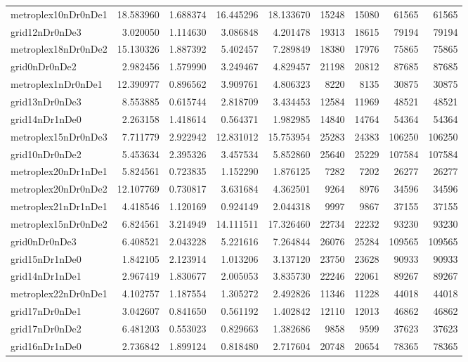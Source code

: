 \begin{longtable}{|l|r|r|r|r|r|r|r|r|}
metroplex10nDr0nDe1 & 18.583960 & 1.688374 & 16.445296 & 18.133670 & 15248 & 15080 & 61565 & 61565 \\
grid12nDr0nDe3 & 3.020050 & 1.114630 & 3.086848 & 4.201478 & 19313 & 18615 & 79194 & 79194 \\
metroplex18nDr0nDe2 & 15.130326 & 1.887392 & 5.402457 & 7.289849 & 18380 & 17976 & 75865 & 75865 \\
grid0nDr0nDe2 & 2.982456 & 1.579990 & 3.249467 & 4.829457 & 21198 & 20812 & 87685 & 87685 \\
metroplex1nDr0nDe1 & 12.390977 & 0.896562 & 3.909761 & 4.806323 & 8220 & 8135 & 30875 & 30875 \\
grid13nDr0nDe3 & 8.553885 & 0.615744 & 2.818709 & 3.434453 & 12584 & 11969 & 48521 & 48521 \\
grid14nDr1nDe0 & 2.263158 & 1.418614 & 0.564371 & 1.982985 & 14840 & 14764 & 54364 & 54364 \\
metroplex15nDr0nDe3 & 7.711779 & 2.922942 & 12.831012 & 15.753954 & 25283 & 24383 & 106250 & 106250 \\
grid10nDr0nDe2 & 5.453634 & 2.395326 & 3.457534 & 5.852860 & 25640 & 25229 & 107584 & 107584 \\
metroplex20nDr1nDe1 & 5.824561 & 0.723835 & 1.152290 & 1.876125 & 7282 & 7202 & 26277 & 26277 \\
metroplex20nDr0nDe2 & 12.107769 & 0.730817 & 3.631684 & 4.362501 & 9264 & 8976 & 34596 & 34596 \\
metroplex21nDr1nDe1 & 4.418546 & 1.120169 & 0.924149 & 2.044318 & 9997 & 9867 & 37155 & 37155 \\
metroplex15nDr0nDe2 & 6.824561 & 3.214949 & 14.111511 & 17.326460 & 22734 & 22232 & 93230 & 93230 \\
grid0nDr0nDe3 & 6.408521 & 2.043228 & 5.221616 & 7.264844 & 26076 & 25284 & 109565 & 109565 \\
grid15nDr1nDe0 & 1.842105 & 2.123914 & 1.013206 & 3.137120 & 23750 & 23628 & 90933 & 90933 \\
grid14nDr1nDe1 & 2.967419 & 1.830677 & 2.005053 & 3.835730 & 22246 & 22061 & 89267 & 89267 \\
metroplex22nDr0nDe1 & 4.102757 & 1.187554 & 1.305272 & 2.492826 & 11346 & 11228 & 44018 & 44018 \\
grid17nDr0nDe1 & 3.042607 & 0.841650 & 0.561192 & 1.402842 & 12110 & 12013 & 46862 & 46862 \\
grid17nDr0nDe2 & 6.481203 & 0.553023 & 0.829663 & 1.382686 & 9858 & 9599 & 37623 & 37623 \\
grid16nDr1nDe0 & 2.736842 & 1.899124 & 0.818480 & 2.717604 & 20748 & 20654 & 78365 & 78365 \\

\end{longtable}
